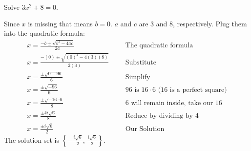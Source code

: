 \begin{exa}
Solve $3x^2+8=0$.
\end{exa}
Since $x$ is missing that means $b=0$. $a$ and $c$ are 3 and 8, respectively. Plug them into the quadratic formula:
	\begin{align*}
					x =\frac{-b \pm \sqrt{b^2-4ac}}{2a}& &&\text{The quadratic formula}\\
					x =\frac{-(0) \pm \sqrt{(0)^2-4(3)(8)}}{2(3)}& &&\text{Substitute}\\
					x =\frac{\pm \sqrt{0-96}}{6}& &&\text{Simplify}\\
					x =\frac{\pm \sqrt{-96}}{6}& && \text{96 is $16\cdot6$ (16 is a perfect square)}\\
					x =\frac{\pm \sqrt{-16\cdot6}}{8}& &&\text{6 will remain inside, take our 16}\\
					x =\frac{\pm 4i\sqrt{6}}{8}& &&\text{Reduce by dividing by 4}\\
					x =\frac{\pm i\sqrt{6}}{2}& &&\text{Our Solution}
	\end{align*}
The solution set is $\left\{-\frac{i\sqrt{6}}{2},\,\frac{ i\sqrt{6}}{2}\right\}$.
